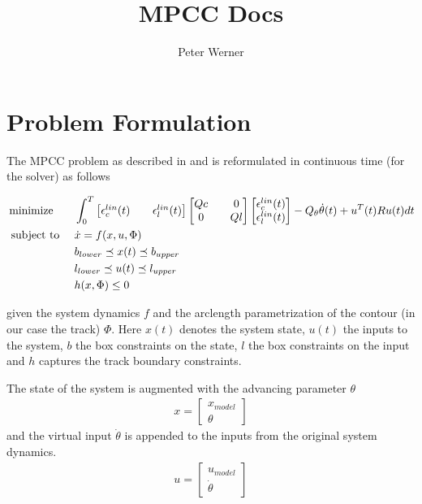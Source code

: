 \documentclass[12pt]{article}
\title{MPCC Docs}
\author{Peter Werner}
\begin{document}
\maketitle

\section{Problem Formulation}

The MPCC problem as described in \cite{lam2010model} and \cite{liniger2015optimization} is reformulated in continuous time (for the solver) as follows

\begin{align}
\begin{aligned}
&\mathop{\text{minimize }} &&\int_{0}^{T}\begin{bmatrix}
\epsilon_c^{lin}(t)&&\epsilon_l^{lin}(t)
\end{bmatrix}
\begin{bmatrix}
Qc&&0\\0&&Ql
\end{bmatrix}
\begin{bmatrix}
\epsilon_c^{lin}(t)\\
\epsilon_l^{lin}(t)
\end{bmatrix} - Q_{\theta}\dot{\theta}(t) + u^T(t) R u(t)dt\\
&\text{ subject to }  &&\dot{x} = f(x,u,\Phi)\\
&&& b_{lower}\preceq x(t) \preceq b_{upper}\\
&&& l_{lower}\preceq u(t) \preceq l_{upper}\\
&&& h(x, \Phi) \leq 0
\end{aligned}
\end{align}

given the system dynamics $f$ and the arclength parametrization of the contour (in our case the track) $\Phi$. Here $x(t)$ denotes the system state, $u(t)$ the inputs to the system, $b$ the box constraints on the state, $l$ the box constraints on the input and $h$ captures the track boundary constraints.

The state of the system is augmented with the advancing parameter $\theta$ 
\begin{align}
x = \begin{bmatrix}
x_{model}\\
\theta
\end{bmatrix}
\end{align}
 and the virtual input $\dot\theta$ is appended to the inputs from the original system dynamics. 
\begin{align}
u = \begin{bmatrix}
u_{model}\\\dot\theta
\end{bmatrix}
\end{align}
\end{document}
